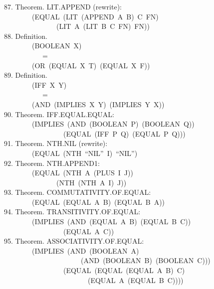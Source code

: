 \documentclass[10pt]{book}
\newenvironment{pubasis}{\begin{flushleft}}{\end{flushleft}}
\begin{document}
\begin{pubasis}
87.     Theorem.  LIT.APPEND (rewrite):\\
~~~~~~~~(EQUAL~(LIT~(APPEND~A~B)~C~FN)\\
~~~~~~~~~~~~~~~(LIT~A~(LIT~B~C~FN)~FN))\\

88.     Definition.\\
~~~~~~~~(BOOLEAN~X)\\
~~~~~~~~~~~=\\
~~~~~~~~(OR~(EQUAL~X~T)~(EQUAL~X~F))\\

89.     Definition.\\
~~~~~~~~(IFF~X~Y)\\
~~~~~~~~~~~=\\
~~~~~~~~(AND~(IMPLIES~X~Y)~(IMPLIES~Y~X))\\

90.     Theorem.  IFF.EQUAL.EQUAL:\\
~~~~~~~~(IMPLIES~(AND~(BOOLEAN~P)~(BOOLEAN~Q))\\
~~~~~~~~~~~~~~~~~(EQUAL~(IFF~P~Q)~(EQUAL~P~Q)))\\

91.     Theorem.  NTH.NIL (rewrite):\\
~~~~~~~~(EQUAL~(NTH~``NIL''~I)~``NIL'')\\

92.     Theorem.  NTH.APPEND1:\\
~~~~~~~~(EQUAL~(NTH~A~(PLUS~I~J))\\
~~~~~~~~~~~~~~~(NTH~(NTH~A~I)~J))\\

93.     Theorem.  COMMUTATIVITY.OF.EQUAL:\\
~~~~~~~~(EQUAL~(EQUAL~A~B)~(EQUAL~B~A))\\

94.     Theorem.  TRANSITIVITY.OF.EQUAL:\\
~~~~~~~~(IMPLIES~(AND~(EQUAL~A~B)~(EQUAL~B~C))\\
~~~~~~~~~~~~~~~~~(EQUAL~A~C))\\

95.     Theorem.  ASSOCIATIVITY.OF.EQUAL:\\
~~~~~~~~(IMPLIES~(AND~(BOOLEAN~A)\\
~~~~~~~~~~~~~~~~~~~~~~(AND~(BOOLEAN~B)~(BOOLEAN~C)))\\
~~~~~~~~~~~~~~~~~(EQUAL~(EQUAL~(EQUAL~A~B)~C)\\
~~~~~~~~~~~~~~~~~~~~~~~~(EQUAL~A~(EQUAL~B~C))))\\


\end{pubasis}
\end{document}
